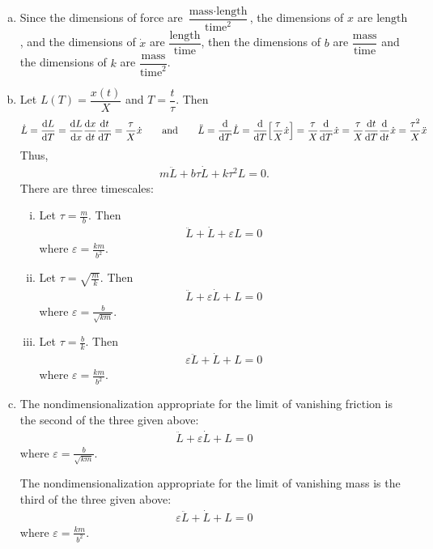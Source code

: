 \documentclass{article} %
\theoremstyle{plain}
\newcommand{\E}{\varepsilon}
\numberwithin{equation}{section} %
\numberwithin{figure}{section} %
\numberwithin{table}{section} %
\begin{document}
\begin{enumerate}[(a)]
    \item
        Since the dimensions of force are $\dfrac{\text{mass}\cdot\text{length}}{\text{time}^2}$, the dimensions of $x$ are $\text{length}$, and the dimensions of $\dot{x}$ are $\dfrac{\text{length}}{\text{time}}$, then the dimensions of $b$ are $\dfrac{\text{mass}}{\text{time}}$ and the dimensions of $k$ are $\dfrac{\text{mass}}{\text{time}^2}$.
    \item
        Let $L(T) = \dfrac{x(t)}{X}$ and $T = \dfrac{t}{\tau}$.  Then
        \begin{align*}
            \dot{L} = \frac{\dd L}{\dd T} = \frac{\dd L}{\dd x} \frac{\dd x}{\dd t} \frac{\dd t}{\dd T} = \frac{\tau}{X}\dot{x} \qquad \text{and} \qquad \ddot{L} = \frac{\dd}{\dd T}\dot{L} = \frac{\dd}{\dd T} \qty[\frac{\tau}{X}\dot{x}] = \frac{\tau}{X} \frac{\dd}{\dd T} \dot{x} = \frac{\tau}{X}\frac{\dd t}{\dd T} \frac{\dd}{\dd t}\dot{x} = \frac{\tau^2}{X}\ddot{x}
        \end{align*}
        Thus,
        \begin{align*}
            m\ddot{L} + b\tau\dot{L} + k\tau^2 L = 0.
        \end{align*}
        There are three timescales:
        \begin{enumerate}[(i)]
            \item
                Let $\tau = \frac{m}{b}$.  Then
                \begin{align*}
                    \ddot{L} + \dot{L} + \E L = 0
                \end{align*}
                where $\E = \frac{km}{b^2}$.
            \item
                Let $\tau = \sqrt{\frac{m}{k}}$.  Then
                \begin{align*}
                    \ddot{L} + \E\dot{L} + L = 0
                \end{align*}
                where $\E = \frac{b}{\sqrt{km}}$.
            \item
                Let $\tau = \frac{b}{k}$.  Then
                \begin{align*}
                    \E\ddot{L} + \dot{L} + L = 0
                \end{align*}
                where $\E = \frac{km}{b^2}$.
        \end{enumerate}
    \item
        The nondimensionalization appropriate for the limit of vanishing friction is the second of the three given above:
        \begin{align*}
            \ddot{L} + \E\dot{L} + L = 0
        \end{align*}
        where $\E = \frac{b}{\sqrt{km}}$.

        The nondimensionalization appropriate for the limit of vanishing mass is the third of the three given above:
        \begin{align*}
            \E\ddot{L} + \dot{L} + L = 0
        \end{align*}
        where $\E = \frac{km}{b^2}$.
\end{enumerate}
\end{document}
